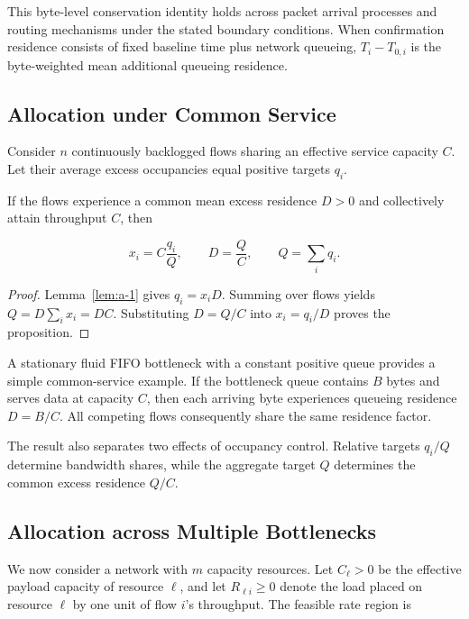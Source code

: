 This byte-level conservation identity holds across packet arrival processes and routing mechanisms under the stated boundary conditions. When confirmation residence consists of fixed baseline time plus network queueing, \(T_i-T_{0,i}\) is the byte-weighted mean additional queueing residence.

\subsection{Allocation under Common Service}
\label{app:a-2}

Consider \(n\) continuously backlogged flows sharing an effective service capacity \(C\). Let their average excess occupancies equal positive targets \(q_i\).

\begin{proposition}
\label{prop:a-1}
If the flows experience a common mean excess residence \(D>0\) and collectively attain throughput \(C\), then

\begin{equation}
\label{eq:app-a-9}
x_i=C\frac{q_i}{Q},
\qquad
D=\frac{Q}{C},
\qquad Q=\sum_iq_i.
\end{equation}
\end{proposition}

\begin{proof} Lemma~\ref{lem:a-1} gives \(q_i=x_iD\). Summing over flows yields \(Q=D\sum_ix_i=DC\). Substituting \(D=Q/C\) into \(x_i=q_i/D\) proves the proposition.
\end{proof}

A stationary fluid FIFO bottleneck with a constant positive queue provides a simple common-service example. If the bottleneck queue contains \(B\) bytes and serves data at capacity \(C\), then each arriving byte experiences queueing residence \(D=B/C\). All competing flows consequently share the same residence factor.

The result also separates two effects of occupancy control. Relative targets \(q_i/Q\) determine bandwidth shares, while the aggregate target \(Q\) determines the common excess residence \(Q/C\).

\subsection{Allocation across Multiple Bottlenecks}
\label{app:a-3}

We now consider a network with \(m\) capacity resources. Let \(C_\ell>0\) be the effective payload capacity of resource \(\ell\), and let \(R_{\ell i}\ge0\) denote the load placed on resource \(\ell\) by one unit of flow \(i\)'s throughput. The feasible rate region is

